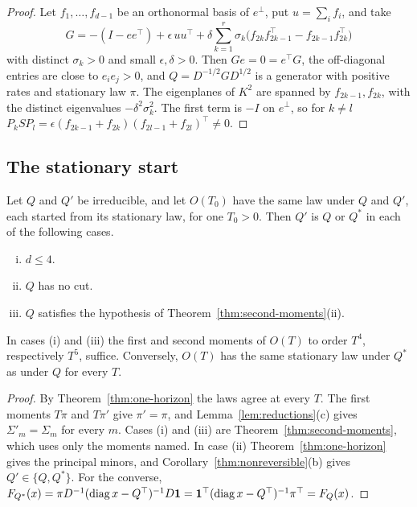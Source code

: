\begin{proof}
Let $f_1,\dots,f_{d-1}$ be an orthonormal basis of $e^\perp$, put $u=\sum_if_i$, and take
\[
 G=-(I-ee^\top)+\epsilon\,uu^\top+\delta\sum_{k=1}^r\sigma_k\bigl(f_{2k}f_{2k-1}^\top-f_{2k-1}f_{2k}^\top\bigr)
\]
with distinct $\sigma_k>0$ and small $\epsilon,\delta>0$. Then $Ge=0=e^\top G$, the off-diagonal
entries are close to $e_ie_j>0$, and $Q=D^{-1/2}GD^{1/2}$ is a generator with positive rates and
stationary law $\pi$. The eigenplanes of $K^2$ are spanned by $f_{2k-1},f_{2k}$, with the distinct
eigenvalues $-\delta^2\sigma_k^2$. The first term is $-I$ on $e^\perp$, so for $k\ne l$
$P_kSP_l=\epsilon(f_{2k-1}+f_{2k})(f_{2l-1}+f_{2l})^\top\ne0$.
\end{proof}

\subsection{The stationary start}\label{sec:law-stationary}

\begin{theorem}\label{thm:stationary-law}
Let $Q$ and $Q'$ be irreducible, and let $O(T_0)$ have the same law under $Q$ and $Q'$, each
started from its stationary law, for one $T_0>0$. Then $Q'$ is $Q$ or $Q^*$ in each of the
following cases.
\begin{enumerate}[(i)]
\item $d\le4$.
\item $Q$ has no cut.
\item $Q$ satisfies the hypothesis of Theorem~\ref{thm:second-moments}(ii).
\end{enumerate}
In cases (i) and (iii) the first and second moments of $O(T)$ to order $T^4$, respectively $T^5$,
suffice. Conversely, $O(T)$ has the same stationary law under $Q^*$ as under $Q$ for every $T$.
\end{theorem}

\begin{proof}
By Theorem~\ref{thm:one-horizon} the laws agree at every $T$. The first moments $T\pi$ and $T\pi'$
give $\pi'=\pi$, and Lemma~\ref{lem:reductions}(c) gives $\Sigma'_m=\Sigma_m$ for every $m$. Cases
(i) and (iii) are Theorem~\ref{thm:second-moments}, which uses only the moments named. In case
(ii) Theorem~\ref{thm:one-horizon} gives the principal minors, and
Corollary~\ref{thm:nonreversible}(b) gives $Q'\in\{Q,Q^*\}$. For the converse,
$F_{Q^*}(x)=\pi D^{-1}(\operatorname{diag}x-Q^\top)^{-1}D\mathbf{1}=\mathbf{1}^\top(\operatorname{diag}x-Q^\top)^{-1}\pi^\top=F_Q(x)$.
\end{proof}

